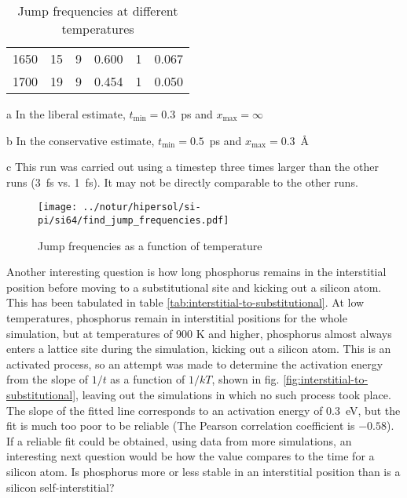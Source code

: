 \documentclass[11pt,bibliography=totoc,index=totoc]{scrbook}   %
\begin{document}
\begin{table}[htbp]
\begin{threeparttable}[htbp]
\begin{tabular}{rrrrrr}
        1650 &  15 &  9 & 0.600 &  1 & 0.067 \\
        1700 &  19 &  9 & 0.454 &  1 & 0.050 \\
      \bottomrule
    \end{tabular}
    {\footnotesize
    \begin{tablenotes}
      \item[a] In the liberal estimate, $t_{\text{min}}=0.3$~ps and $x_{\text{max}}=\infty$
      \item[b] In the conservative estimate, $t_{\text{min}}=0.5$~ps and $x_{\text{max}}=0.3$~Å
      \item[c] This run was carried out using a timestep three times larger than the other runs (3~fs vs. 1~fs). 
          It may not be directly comparable to the other runs.
    \end{tablenotes}
    }
  \end{threeparttable}
  \caption{Jump frequencies at different temperatures}
  \label{tab:jumps}
\end{table}

\begin{figure}[htbp]
  \centering
  \texttt{[image: ../notur/hipersol/si-pi/si64/find\_jump\_frequencies.pdf]}
  \caption{Jump frequencies as a function of temperature}
  \label{fig:jumpfreq}
\end{figure}

Another interesting question is how long phosphorus remains in the interstitial position before moving to a substitutional site and kicking out a silicon atom.
This has been tabulated in table \ref{tab:interstitial-to-substitutional}.
At low temperatures, phosphorus remain in interstitial positions for the whole simulation, but at temperatures of 900 K and higher, 
phosphorus almost always enters a lattice site during the simulation, kicking out a silicon atom.
This is an activated process, so an attempt was made to determine the activation energy from the slope of $1/t$ as a function of $1/kT$, 
shown in fig. \ref{fig:interstitial-to-substitutional}, leaving out the simulations in which no such process took place.
The slope of the fitted line corresponds to an activation energy of 0.3~eV, but the fit is much too poor to be reliable (The Pearson correlation coefficient is $-0.58$).
If a reliable fit could be obtained, using data from more simulations, an interesting next question would be how the value compares to the time for a silicon atom. Is phosphorus more or less stable in an interstitial position than is a silicon self-interstitial?
\end{document}

